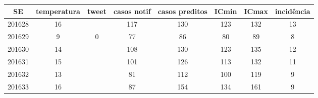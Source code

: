 \begin{tabular}{c|ccccccc}
  \hline
SE & temperatura & tweet & casos notif & casos preditos & ICmin & ICmax & incidência \\ 
  \hline
201628 & 16 &  & 117 & 130 & 123 & 132 & 13 \\ 
  201629 & 9 & 0 & 77 & 86 & 80 & 89 & 8 \\ 
  201630 & 14 &  & 108 & 130 & 123 & 135 & 12 \\ 
  201631 & 15 &  & 101 & 126 & 113 & 132 & 11 \\ 
  201632 & 13 &  & 81 & 112 & 100 & 119 & 9 \\ 
  201633 & 16 &  & 87 & 154 & 134 & 161 & 9 \\ 
   \hline
\end{tabular}
